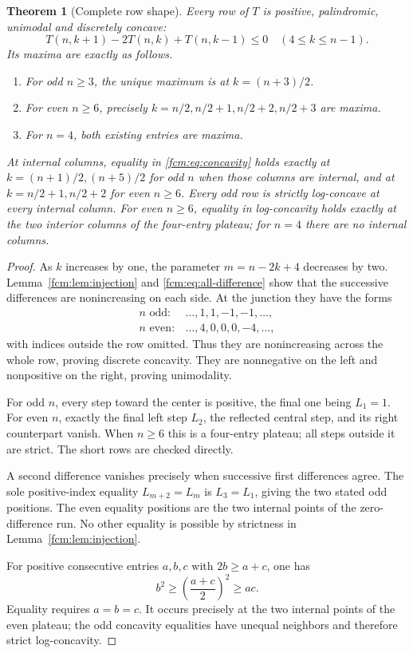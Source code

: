 \documentclass[11pt,letterpaper]{article}
\newtheorem{theorem}{Theorem}[section]
\theoremstyle{remark}\newtheorem{remark}[theorem]{Remark}
\begin{document}
\begin{theorem}[Complete row shape]\label{fcm:thm:shape}
Every row of $T$ is positive, palindromic, unimodal and discretely concave:
\begin{equation}\label{fcm:eq:concavity}
 T(n,k+1)-2T(n,k)+T(n,k-1)\le0\quad(4\le k\le n-1).
\end{equation}
Its maxima are exactly as follows.
\begin{enumerate}[label=(\roman*)]
\item For odd $n\ge3$, the unique maximum is at $k=(n+3)/2$.
\item For even $n\ge6$, precisely $k=n/2,n/2+1,n/2+2,n/2+3$ are maxima.
\item For $n=4$, both existing entries are maxima.
\end{enumerate}
At internal columns, equality in \eqref{fcm:eq:concavity} holds exactly at $k=(n+1)/2,(n+5)/2$ for odd $n$ when those columns are internal, and at $k=n/2+1,n/2+2$ for even $n\ge6$. Every odd row is strictly log-concave at every internal column. For even $n\ge6$, equality in log-concavity holds exactly at the two interior columns of the four-entry plateau; for $n=4$ there are no internal columns.
\end{theorem}
\begin{proof}
As $k$ increases by one, the parameter $m=n-2k+4$ decreases by two. Lemma~\ref{fcm:lem:injection} and \eqref{fcm:eq:all-difference} show that the successive differences are nonincreasing on each side. At the junction they have the forms
\[
 \begin{array}{ll}
 n\text{ odd}:&\ldots,1,1,-1,-1,\ldots,\\
 n\text{ even}:&\ldots,4,0,0,0,-4,\ldots,
 \end{array}
\]
with indices outside the row omitted. Thus they are nonincreasing across the whole row, proving discrete concavity. They are nonnegative on the left and nonpositive on the right, proving unimodality.

For odd $n$, every step toward the center is positive, the final one being $L_1=1$. For even $n$, exactly the final left step $L_2$, the reflected central step, and its right counterpart vanish. When $n\ge6$ this is a four-entry plateau; all steps outside it are strict. The short rows are checked directly.

A second difference vanishes precisely when successive first differences agree. The sole positive-index equality $L_{m+2}=L_m$ is $L_3=L_1$, giving the two stated odd positions. The even equality positions are the two internal points of the zero-difference run. No other equality is possible by strictness in Lemma~\ref{fcm:lem:injection}.

For positive consecutive entries $a,b,c$ with $2b\ge a+c$, one has
\[
 b^2\ge\left(\frac{a+c}{2}\right)^2\ge ac.
\]
Equality requires $a=b=c$. It occurs precisely at the two internal points of the even plateau; the odd concavity equalities have unequal neighbors and therefore strict log-concavity.
\end{proof}
\end{document}
